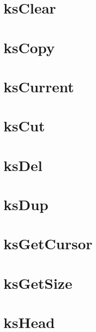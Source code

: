 \let\mypdfximage\pdfximage\def\pdfximage{\immediate\mypdfximage}\documentclass[twoside]{book}
\newcommand{\+}{\discretionary{\mbox{\scriptsize$\hookleftarrow$}}{}{}}
\begin{document}
\chapter{ks\+Clear}
\label{doc_api_review_core_ksClear_md}

\chapter{ks\+Copy}
\label{doc_api_review_core_ksCopy_md}

\chapter{ks\+Current}
\label{doc_api_review_core_ksCurrent_md}

\chapter{ks\+Cut}
\label{doc_api_review_core_ksCut_md}

\chapter{ks\+Del}
\label{doc_api_review_core_ksDel_md}

\chapter{ks\+Dup}
\label{doc_api_review_core_ksDup_md}

\chapter{ks\+Get\+Cursor}
\label{doc_api_review_core_ksGetCursor_md}

\chapter{ks\+Get\+Size}
\label{doc_api_review_core_ksGetSize_md}

\chapter{ks\+Head}
\label{doc_api_review_core_ksHead_md}

\end{document}
